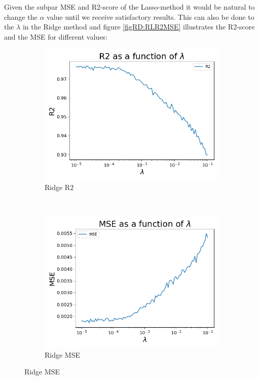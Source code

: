 \documentclass[12pt]{article}
\begin{document}
Given the subpar MSE and R2-score of the Lasso-method it would be natural to change the $\alpha$ value until we receive satisfactory results. This can also be done to the $\lambda$ in the Ridge method and figure \ref{figRD:RLR2MSE} illustrates the R2-score and the MSE for different values:
\begin{figure}[H]
\centering
\begin{subfigure}[t]{0.48\textwidth}
\includegraphics[width=\linewidth]{../figures/RidgeR2.png}
\caption{Ridge R2}
\label{figRD:RR2}
\end{subfigure}
\ \
\begin{subfigure}[t]{0.48\textwidth}
\includegraphics[width = \linewidth]{../figures/RidgeMSE.png}
\caption{Ridge MSE}

\end{subfigure}
\end{figure}
\end{document}
